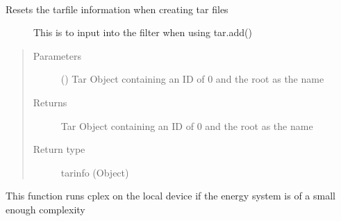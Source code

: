 \documentclass[a4paper,12pt,english]{article}
\begin{document}
\begin{fulllineitems}

\begin{fulllineitems}
\label{\detokenize{GOCPI:GOCPI.Optimisation.Optimisation.reset}}~\begin{description}
\item[{Resets the tarfile information when creating tar files}] \leavevmode
This is to input into the filter when using tar.add()

\end{description}
\begin{quote}\begin{description}
\item[{Parameters}] \leavevmode
{} () \textendash{} Tar Object containing an ID of 0 and the root as the name

\item[{Returns}] \leavevmode
Tar Object containing an ID of 0 and the root as the name

\item[{Return type}] \leavevmode
tarinfo (Object)

\end{description}\end{quote}

\end{fulllineitems}


\begin{fulllineitems}
\label{\detokenize{GOCPI:GOCPI.Optimisation.Optimisation.run_cplex_local}}
This function runs cplex on the local device if the energy system
is of a small enough complexity

\end{fulllineitems}



\end{fulllineitems}
\end{document}
